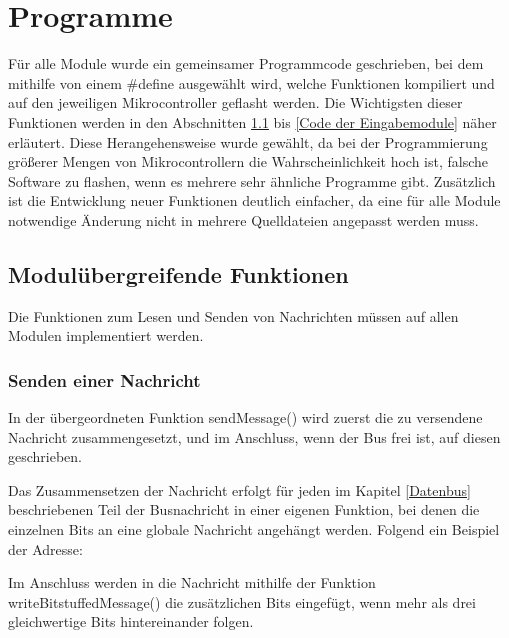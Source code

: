 \section{Programme}
Für alle Module wurde ein gemeinsamer Programmcode geschrieben, bei dem mithilfe von einem \#define ausgewählt wird, welche Funktionen kompiliert und auf den jeweiligen Mikrocontroller geflasht werden. Die Wichtigsten dieser Funktionen werden in den Abschnitten \ref{Modulübergreifende Funktionen} bis \ref{Code der Eingabemodule} näher erläutert. Diese Herangehensweise wurde gewählt, da bei der Programmierung größerer Mengen von Mikrocontrollern die Wahrscheinlichkeit hoch ist, falsche Software zu flashen, wenn es mehrere sehr ähnliche Programme gibt. Zusätzlich ist die Entwicklung neuer Funktionen deutlich einfacher, da eine für alle Module notwendige Änderung nicht in mehrere Quelldateien angepasst werden muss.

\subsection{Modulübergreifende Funktionen}
\label{Modulübergreifende Funktionen}
Die Funktionen zum Lesen und Senden von Nachrichten müssen auf allen Modulen implementiert werden.

\subsubsection{Senden einer Nachricht}
In der übergeordneten Funktion sendMessage() wird zuerst die zu versendene Nachricht zusammengesetzt, und im Anschluss, wenn der Bus frei ist, auf diesen geschrieben.



Das Zusammensetzen der Nachricht erfolgt für jeden im Kapitel \ref{Datenbus} beschriebenen Teil der Busnachricht in einer eigenen Funktion, bei denen die einzelnen Bits an eine globale Nachricht angehängt werden. Folgend ein Beispiel der Adresse:



Im Anschluss werden in die Nachricht mithilfe der Funktion writeBitstuffedMessage() die zusätzlichen Bits eingefügt, wenn mehr als drei gleichwertige Bits hintereinander folgen. 

